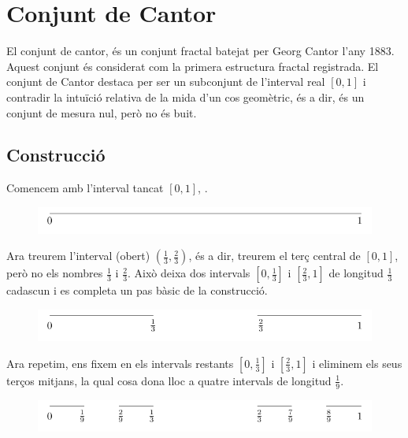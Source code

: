 \documentclass[12pt,a4paper]{report}
\begin{document}
\section{Conjunt de Cantor}
El conjunt de cantor, és un conjunt fractal batejat per Georg Cantor l'any 1883. Aquest conjunt és considerat com la primera estructura fractal registrada. El conjunt de Cantor destaca per ser un subconjunt de l'interval real $[0,1]$ i contradir la intuïció relativa de la mida d'un cos geomètric, és a dir, és un conjunt de mesura nul, però no és buit.
\subsection{Construcció}
Comencem amb l'interval tancat $[0,1]$, \cite[p.~66]{ChaosFractal}.
\begin{figure}[!ht]
\centering
\includegraphics[scale=1]{img/img03_01_cantor.pdf}
\end{figure}

Ara treurem l'interval (obert) $\displaystyle\left(\frac{1}{3},\frac{2}{3}\right)$, és a dir, treurem el terç central de $[0,1]$, però no els nombres $\displaystyle\frac{1}{3}$ i $\displaystyle\frac{2}{3}$. Això deixa dos intervals $\displaystyle\left[0,\frac{1}{3}\right]$ i $\displaystyle\left[\frac{2}{3},1\right]$ de longitud $\displaystyle\frac{1}{3}$ cadascun i es completa un pas bàsic de la construcció.
\begin{figure}[!ht]
\centering
\includegraphics[scale=1]{img/img03_02_cantor.pdf}
\end{figure}

Ara repetim, ens fixem en els intervals restants $\displaystyle\left[0,\frac{1}{3}\right]$ i $\displaystyle\left[\frac{2}{3},1\right]$ i eliminem els seus terços mitjans, la qual cosa dona lloc a quatre intervals de longitud $\displaystyle\frac{1}{9}$.
\begin{figure}[!ht]
\centering
\includegraphics[scale=1]{img/img03_03_cantor.pdf}
\end{figure}
\end{document}
